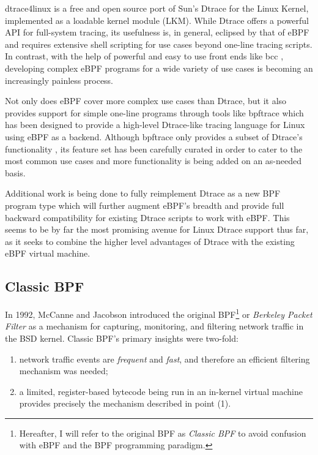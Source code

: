 \documentclass[
  12pt]{findlay}
\providecommand{\tightlist}{\setlength{\itemsep}{0pt}\setlength{\parskip}{0pt}}
\begin{document}
dtrace4linux \autocite{dtrace4linux} is a free and open source port of
Sun's Dtrace \autocite{cantrill04} for the Linux Kernel, implemented as
a loadable kernel module (LKM). While Dtrace offers a powerful API for
full-system tracing, its usefulness is, in general, eclipsed by that of
eBPF \autocite{gregg18} and requires extensive shell scripting for use
cases beyond one-line tracing scripts. In contrast, with the help of
powerful and easy to use front ends like bcc \autocite{bcc}, developing
complex eBPF programs for a wide variety of use cases is becoming an
increasingly painless process.

Not only does eBPF cover more complex use cases than Dtrace, but it also
provides support for simple one-line programs through tools like
bpftrace \autocite{gregg18,bpftrace} which has been designed to provide
a high-level Dtrace-like tracing language for Linux using eBPF as a
backend. Although bpftrace only provides a subset of Dtrace's
functionality \autocite{gregg18}, its feature set has been carefully
curated in order to cater to the most common use cases and more
functionality is being added on an as-needed basis.

Additional work is being done to fully reimplement Dtrace as a new BPF
program type \autocite{vanhees19} which will further augment eBPF's
breadth and provide full backward compatibility for existing Dtrace
scripts to work with eBPF. This seems to be by far the most promising
avenue for Linux Dtrace support thus far, as it seeks to combine the
higher level advantages of Dtrace with the existing eBPF virtual
machine.

\FloatBarrier

\hypertarget{classic-bpf}{%
\subsection{Classic BPF}\label{classic-bpf}}

In 1992, McCanne and Jacobson \autocite{bpf} introduced the original
BPF\footnote{Hereafter,
I will refer to the original BPF as {\itshape Classic BPF} to avoid confusion with eBPF and the BPF programming paradigm.}
or \emph{Berkeley Packet Filter} as a mechanism for capturing,
monitoring, and filtering network traffic in the BSD kernel. Classic
BPF's primary insights were two-fold:

\begin{enumerate}
\def\labelenumi{\arabic{enumi})}
\tightlist
\item
  network traffic events are \emph{frequent} and \emph{fast}, and
  therefore an efficient filtering mechanism was needed;
\item
  a limited, register-based bytecode being run in an in-kernel virtual
  machine provides precisely the mechanism described in point (1).
\end{enumerate}
\end{document}
